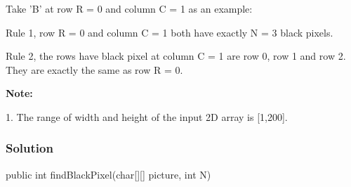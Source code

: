 Take 'B' at row R = 0 and column C = 1 as an example:

Rule 1, row R = 0 and column C = 1 both have exactly N = 3 black pixels.

Rule 2, the rows have black pixel at column C = 1 are row 0, row 1 and row 2. They are exactly the same as row R = 0.

\textbf{Note:}

1. The range of width and height of the input 2D array is [1,200].

\subsubsection{Solution}

\begin{Code}
public int findBlackPixel(char[][] picture, int N) {

}
\end{Code}

\newpage